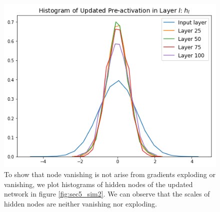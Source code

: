 \begin{figure}
    \begin{minipage}[c]{0.67\textwidth}
        \includegraphics[width=\textwidth]{"NodeHistogram"}
    \end{minipage}\hfill
    \begin{minipage}[c]{0.3\textwidth}
        \caption{To show that node vanishing is not arise from gradients exploding or vanishing, we plot histograms of hidden nodes of the updated network in figure \ref{fig:sec5_sim2}. We can observe that the scales of hidden nodes are neither vanishing nor exploding.}
        \label{fig:sec6_sim1}
    \end{minipage}
\end{figure}